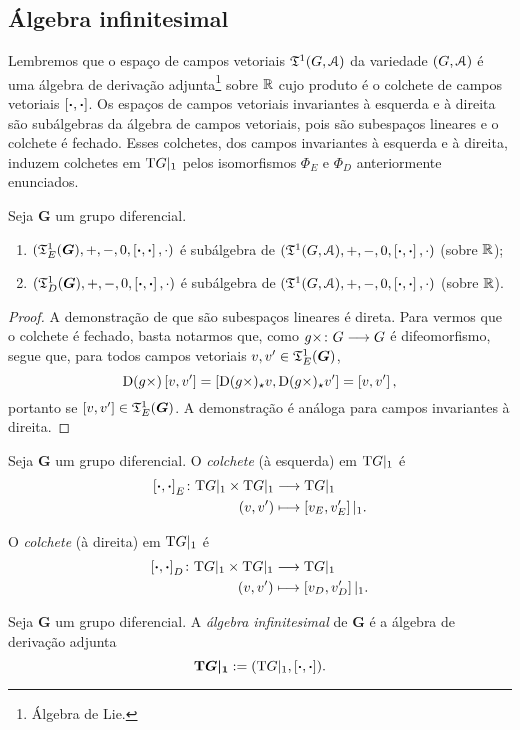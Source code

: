 \subsection{Álgebra infinitesimal}

Lembremos que o espaço de campos vetoriais $\mathfrak{T}^1(G,\mathcal{A})$ da variedade $(G,\mathcal{A})$ é uma álgebra de derivação adjunta\footnote{Álgebra de Lie.} sobre $\mathbb{R}$ cujo produto é o colchete de campos vetoriais $\left[{\bm{\cdot}},{\bm{\cdot}}\right]$. Os espaços de campos vetoriais invariantes à esquerda e à direita são subálgebras da álgebra de campos vetoriais, pois são subespaços lineares e o colchete é fechado. Esses colchetes, dos campos invariantes à esquerda e à direita, induzem colchetes em $\mathrm{T} G|_1$ pelos isomorfismos $\Phi_E$ e $\Phi_D$ anteriormente enunciados.

\begin{proposition}
Seja $\bm G$ um grupo diferencial.
	\begin{enumerate}
	\item $(\mathfrak{T}^1_E(\bm G),+,-,0,\left[{\bm{\cdot}},{\bm{\cdot}}\right],\cdot)$ é subálgebra de $(\mathfrak{T}^1(G,\mathcal{A}),+,-,0,\left[{\bm{\cdot}},{\bm{\cdot}}\right],\cdot)$ (sobre $\mathbb{R}$);
	\item $(\mathfrak{T}^1_D(\bm G),+,-,0,\left[{\bm{\cdot}},{\bm{\cdot}}\right],\cdot)$ é subálgebra de $(\mathfrak{T}^1(G,\mathcal{A}),+,-,0,\left[{\bm{\cdot}},{\bm{\cdot}}\right],\cdot)$ (sobre $\mathbb{R}$).
	\end{enumerate}
\end{proposition}
\begin{proof}
A demonstração de que são subespaços lineares é direta. Para vermos que o colchete é fechado, basta notarmos que, como ${g\times}\colon {G} \longrightarrow {G}$ é difeomorfismo, segue que, para todos campos vetoriais $v,v' \in \mathfrak{T}^1_E(\bm G)$,
	\begin{equation*}
	\mathrm{D} (g\times)\left[{v},{v'}\right] = \left[{\mathrm{D}(g \times)_\star v},{\mathrm{D}(g \times)_\star v'}\right] = \left[{v},{v'}\right],
	\end{equation*}
portanto se $\left[{v},{v'}\right] \in \mathfrak{T}^1_E(\bm G)$. A demonstração é análoga para campos invariantes à direita.
\end{proof}

\begin{definition}
Seja $\bm G$ um grupo diferencial. O \emph{colchete} (à esquerda) em $\mathrm{T} G|_1$ é
	\begin{align*}
	{\left[{\bm{\cdot}},{\bm{\cdot}}\right]_E}\colon {\mathrm{T}G|_1 \times \mathrm{T}G|_1} &\longrightarrow {\mathrm{T}G|_1} \\{(v,v')} &\longmapsto \left[{v_E},{v'_E}\right]|_1.
	\end{align*}

O \emph{colchete} (à direita) em $\mathrm{T} G|_1$ é
	\begin{align*}
	{\left[{\bm{\cdot}},{\bm{\cdot}}\right]_D}\colon {\mathrm{T}G|_1 \times \mathrm{T}G|_1} &\longrightarrow {\mathrm{T}G|_1} \\{(v,v')} &\longmapsto \left[{v_D},{v'_D}\right]|_1.
	\end{align*}
\end{definition}

\begin{definition}
Seja $\bm G$ um grupo diferencial. A \emph{álgebra infinitesimal} de $\bm G$ é a álgebra de derivação adjunta
	\begin{equation*}
	\bm{\mathrm{T} G|_1} := (\mathrm{T} G|_1,\left[{\bm{\cdot}},{\bm{\cdot}}\right]).
	\end{equation*}
\end{definition}
